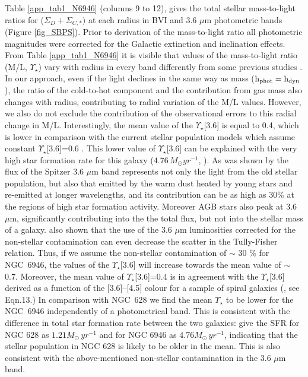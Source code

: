 \documentclass[fleqn,usenatbib]{mnras}
\begin{document}
Table \ref{app_tab1_N6946} (columns 9 to 12), gives the total stellar mass-to-light ratios for ($\Sigma_D + \Sigma_{C,*})$ at each radius in BVI and 3.6 $\mu$m photometric bands (Figure \ref{fig_SBPS}). Prior to derivation of the mass-to-light ratio all photometric magnitudes were corrected for the Galactic extinction and inclination effects.
From Table \ref{app_tab1_N6946} it is visible that values of the mass-to-light ratio (M/L, $\Upsilon_{\star}$) vary with radius in every band differently from some previous studies \citep{martinsson13,swaters14}. In our approach, even if the light declines in the same way as mass ($\rm h_{phot}=h_{dyn}$), the ratio of the cold-to-hot component and the contribution from gas mass also changes with radius, contributing to radial variation of the M/L values. However, we also do not exclude the contribution of the observational errors to this radial change in M/L. Interestingly, the mean value of the $\Upsilon_{\star}$[3.6] is equal to 0.4, which is lower in comparison with the current stellar population models which assume constant $\Upsilon_{\star}$[3.6]=0.6 \citep{meidt12,rock15}. This lower value of $\Upsilon_{\star}$[3.6] can be explained with the very high star formation rate for this galaxy ($4.76 \, M_\odot yr^{-1}$, \citealp{things}). As was shown by \citet{miguel15} the flux of the Spitzer 3.6 $\mu$m band represents not only the light from the old stellar population, but also that emitted by the warm dust heated by young stars and re-emitted at longer wavelengths, and its contribution can be as high as 30\% at the regions of high star formation activity. Moreover AGB stars also peak at 3.6 $\mu$m, significantly contributing into the the total flux, but not into the stellar mass of a galaxy. \citet{ponom17} also shown that the use of the 3.6 $\mu$m luminosities corrected for the non-stellar contamination can even decrease the scatter in the Tully-Fisher relation. Thus, if we assume the non-stellar contamination of $\sim$ 30 \% for NGC~6946, the values of the $\Upsilon_{\star}$[3.6] will increase towards the mean value of $\sim$ 0.7. Moreover, the mean value of $\Upsilon_{\star}$[3.6]=0.4 is in agreement with the $\Upsilon_{\star}$[3.6] derived as a function of the [3.6]--[4.5] colour for a sample of spiral galaxies (\citealp{ponomareva18}, see Eqn.13.)  
In comparison with NGC~628  we find the mean $\Upsilon_{\star}$ to be lower for the NGC~6946 independently of a photometrical band. This is consistent with the difference in total star formation rate between the two galaxies: \citet{things} give the SFR for NGC 628 as  $1.21 M_\odot \,yr^{-1}$  and for NGC 6946 as $4.76 M_\odot \,yr^{-1}$, indicating that the stellar population in NGC 628 is likely to be older in the mean. This is also consistent with the above-mentioned non-stellar contamination in the 3.6 $\mu$m band. 
\end{document}
